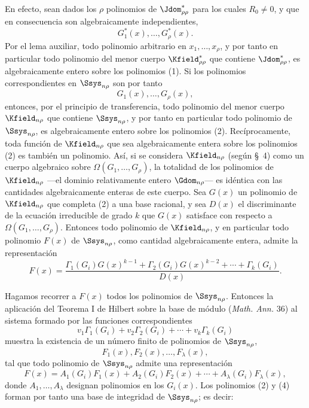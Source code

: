 \documentclass[11pt]{article}
\begin{document}
En efecto, sean dados los $\rho$ polinomios de $\Jdom^*_{\rho\rho}$ para los cuales $R_0\ne0$, y que en consecuencia son algebraicamente independientes,
\begin{equation}
  G_1^*(x),\ldots,G_\rho^*(x).
\tag{1}
\end{equation}
Por el lema auxiliar, todo polinomio arbitrario en $x_1,\ldots,x_\rho$, y por tanto en particular todo polinomio del menor cuerpo $\Kfield^*_{\rho\rho}$ que contiene $\Jdom^*_{\rho\rho}$, es algebraicamente entero sobre los polinomios (1). Si los polinomios correspondientes en $\Ssys_{n\rho}$ son por tanto
\begin{equation}
  G_1(x),\ldots,G_\rho(x),
\tag{2}
\end{equation}
entonces, por el principio de transferencia, todo polinomio del menor cuerpo $\Kfield_{n\rho}$ que contiene $\Ssys_{n\rho}$, y por tanto en particular todo polinomio de $\Ssys_{n\rho}$, es algebraicamente entero sobre los polinomios (2). Recíprocamente, toda función de $\Kfield_{n\rho}$ que sea algebraicamente entera sobre los polinomios (2) es también un polinomio. Así, si se considera $\Kfield_{n\rho}$ (según \S\ 4) como un cuerpo algebraico sobre $\Omega(G_1,\ldots,G_\rho)$, la totalidad de los polinomios de $\Kfield_{n\rho}$ ---el dominio relativamente entero $\Gdom_{n\rho}$--- es idéntica con las cantidades algebraicamente enteras de este cuerpo. Sea $G(x)$ un polinomio de $\Kfield_{n\rho}$ que completa (2) a una base racional, y sea $D(x)$ el discriminante de la ecuación irreducible de grado $k$ que $G(x)$ satisface con respecto a $\Omega(G_1,\ldots,G_\rho)$. Entonces todo polinomio de $\Kfield_{n\rho}$, y en particular todo polinomio $F(x)$ de $\Ssys_{n\rho}$, como cantidad algebraicamente entera, admite la representación
\begin{equation}
  F(x)=\frac{\Gamma_1(G_i)G(x)^{k-1}+\Gamma_2(G_i)G(x)^{k-2}+\cdots+\Gamma_k(G_i)}{D(x)}.
\tag{3}
\end{equation}

Hagamos recorrer a $F(x)$ todos los polinomios de $\Ssys_{n\rho}$. Entonces la aplicación del Teorema I de Hilbert sobre la base de módulo (\emph{Math. Ann.} 36) al sistema formado por las funciones correspondientes
\[
  v_1\Gamma_1(G_i)+v_2\Gamma_2(G_i)+\cdots+v_k\Gamma_k(G_i)
\]
muestra la existencia de un número finito de polinomios de $\Ssys_{n\rho}$,
\begin{equation}
  F_1(x),F_2(x),\ldots,F_\lambda(x),
\tag{4}
\end{equation}
tal que todo polinomio de $\Ssys_{n\rho}$ admite una representación
\begin{equation}
  F(x)=A_1(G_i)F_1(x)+A_2(G_i)F_2(x)+\cdots+A_\lambda(G_i)F_\lambda(x),
\tag{5}
\end{equation}
donde $A_1,\ldots,A_\lambda$ designan polinomios en los $G_i(x)$. Los polinomios (2) y (4) forman por tanto una base de integridad de $\Ssys_{n\rho}$; es decir:
\end{document}
